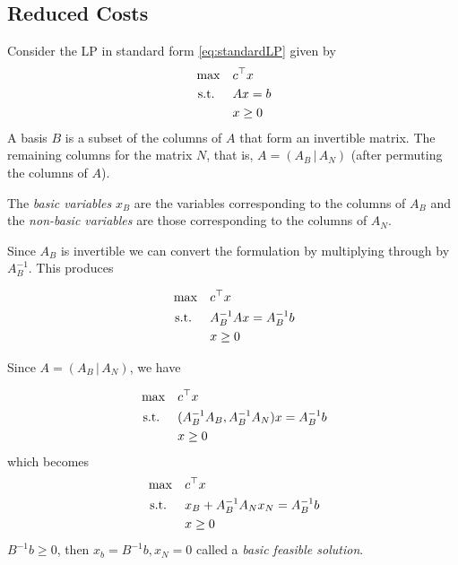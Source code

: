 \subsection{Reduced Costs}
Consider the LP in standard form \eqref{eq:standardLP} given by 
\begin{equation}
\begin{split}
\max \quad & c^\top x\\
\mbox{ s.t. }  \quad & Ax = b\\
& x \geq 0
\end{split}
\end{equation}
 A basis $B$ is a subset of the columns of $A$ that form an invertible matrix.  The remaining columns for the matrix $N$, that is, $A = (A_B\, | \, A_N)$ (after permuting the columns of $A$).  
 
 The \emph{basic variables} $x_B$ are the variables corresponding to the columns of $A_B$ and the \emph{non-basic variables} are those corresponding to the columns of $A_N$.  
 
 Since $A_B$ is invertible we can convert the formulation by multiplying through by $A_B^{-1}$.  This produces
 
  \begin{equation}
\begin{split}
\max \quad & c^\top x\\
\mbox{ s.t. }  \quad & A_B^{-1}Ax = A_B^{-1}b\\
& x \geq 0
\end{split}
\end{equation}

Since $A = (A_B \,|\, A_N)$, we have 

  \begin{equation}
\begin{split}
\max \quad & c^\top x\\
\mbox{ s.t. }  \quad & (A_B^{-1}A_B, A_B^{-1} A_N) x = A_B^{-1}b\\
& x \geq 0
\end{split}
\end{equation}
which becomes 
 \begin{equation}
\begin{split}
\max \quad & c^\top x\\
\mbox{ s.t. }  \quad &x_B +  A_B^{-1} A_N x_N = A_B^{-1}b\\
& x \geq 0
\end{split}
\end{equation}
$B^{-1}b \geq 0$, then $x_b = B^{-1}b, x_N = 0$ called a \emph{basic feasible solution}.  

